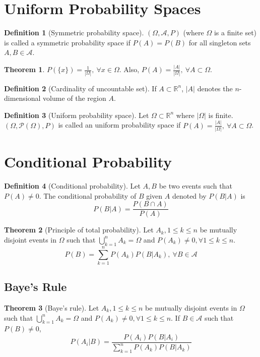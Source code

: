 \documentclass[10pt, a4paper]{extarticle}
\theoremstyle{definition}
\newtheorem{thm}{Theorem}
\newtheorem{defn}{Definition}
\begin{document}
\section{Uniform Probability Spaces}
\begin{defn}[Symmetric probability space]
	$(\Omega, \mathscr{A}, P)$ (where $\Omega$ is a finite set) is called a symmetric probability space if $P(A)=P(B)$ for all singleton sets $A,B\in\mathscr{A}$.
\end{defn}
\begin{thm}
	$P\left(\{x\}\right)=\frac{1}{|\Omega|},\ \forall x\in\Omega$. Also, $P(A)=\frac{|A|}{|\Omega|},\ \forall A\subset\Omega$.
\end{thm}

\begin{defn}[Cardinality of uncountable set]
	If $A\subset \mathbb{R}^n$, $|A|$ denotes the $n$-dimensional volume of the region $A$.
\end{defn}
\begin{defn}[Uniform probability space]
	Let $\Omega\subset\mathbb{R}^n$ where $|\Omega|$ is finite. $(\Omega,\mathcal{P}(\Omega), P)$ is called an uniform probability space if $P(A)=\frac{|A|}{|\Omega|},\ \forall A\subset\Omega$.
\end{defn}

\section{Conditional Probability}
\begin{defn}[Conditional probability]
	Let $A,B$ be two events such that $P(A)\neq 0$. The conditional probability of $B$ given $A$ denoted by $P(B|A)$ is
	\[P(B|A)=\frac{P(B\cap A)}{P(A)}\]
\end{defn}
\begin{thm}[Principle of total probability]
	Let $A_k, 1\leq k\leq n$ be mutually disjoint events in $\Omega$ such that $\bigcup_{k=1}^n A_k=\Omega$ and $P(A_k)\neq 0,\forall 1\leq k\leq n$.
	\[P(B)=\sum_{k=1}^n P(A_k)P(B|A_k),\ \forall B\in\mathscr{A}\]
\end{thm}

\subsection{Baye's Rule}
\begin{thm}[Baye's rule]
	Let $A_k, 1\leq k\leq n$ be mutually disjoint events in $\Omega$ such that $\bigcup_{k=1}^n A_k=\Omega$ and $P(A_k)\neq 0,\forall 1\leq k\leq n$. If $B\in\mathscr{A}$ such that $P(B)\neq 0$,
	\[P(A_i|B)=\frac{P(A_i)P(B|A_i)}{\sum_{k=1}^n P(A_k)P(B|A_k)}\]
\end{thm}
\end{document}
